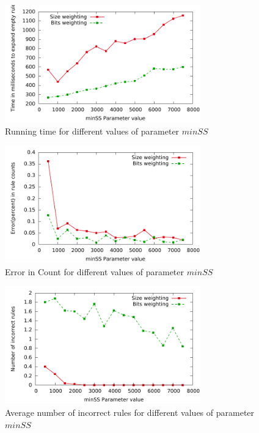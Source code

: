 \begin{figure}
\hspace{-20pt}
  \includegraphics[height=2in]{graphs/minSS_speed.pdf}%
\vspace{-10pt}
  \caption{Running time for different values of parameter $minSS$ \label{fig:minSS_speed}}
\vspace{-13pt}
\end{figure}

\begin{figure}
\hspace{-20pt}
  \includegraphics[height=2in]{graphs/minSS_error_percent.pdf}%
\vspace{-10pt}
  \caption{Error in Count for different values of parameter $minSS$ \label{fig:minSS_error_percent}}
\vspace{-13pt}
\end{figure}

\begin{figure}
\hspace{-20pt}
  \includegraphics[height=2in]{graphs/minSS_error_rule.pdf}%
\vspace{-10pt}
\caption{Average number of incorrect rules for different values of parameter $minSS$ \label{fig:minSS_error_rule}}
\vspace{-13pt}
\end{figure}